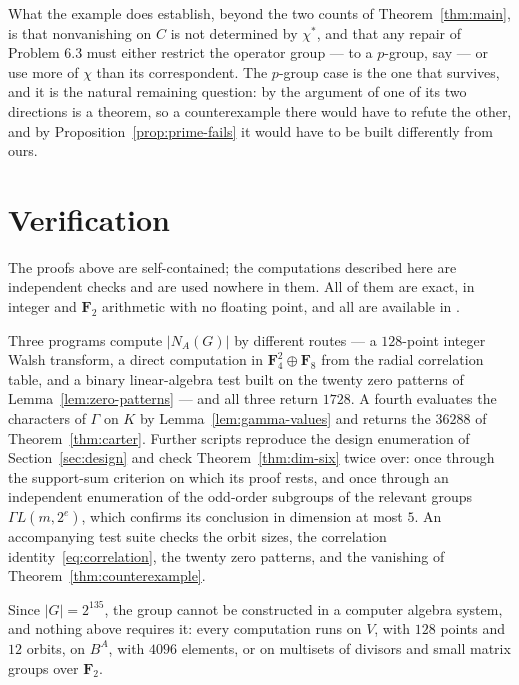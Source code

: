 \documentclass[11pt]{article}
\theoremstyle{definition}
\theoremstyle{remark}
\newcommand{\F}{\mathbf F}
\begin{document}
What the example does establish, beyond the two counts of
Theorem~\ref{thm:main}, is that nonvanishing on $C$ is not determined by
$\chi^*$, and that any repair of Problem 6.3 must either restrict the
operator group --- to a $p$-group, say --- or use more of $\chi$ than
its correspondent.  The $p$-group case is the one that survives, and it
is the natural remaining question: by the argument of
\cite[\S7]{isaacs-carter} one of its two directions is a theorem, so a
counterexample there would have to refute the other, and by
Proposition~\ref{prop:prime-fails} it would have to be built
differently from ours.

\section{Verification}\label{sec:verification}

The proofs above are self-contained; the computations described here are
independent checks and are used nowhere in them.  All of them are exact,
in integer and $\F_2$ arithmetic with no floating point, and all are
available in \cite{code}.

Three programs compute $|N_A(G)|$ by different routes --- a $128$-point
integer Walsh transform, a direct computation in $\F_4^2\oplus\F_8$ from
the radial correlation table, and a binary linear-algebra test built on
the twenty zero patterns of Lemma~\ref{lem:zero-patterns} --- and all
three return $1728$.  A fourth evaluates the characters of $\Gamma$ on
$K$ by Lemma~\ref{lem:gamma-values} and returns the $36288$ of
Theorem~\ref{thm:carter}.  Further scripts reproduce the design
enumeration of Section~\ref{sec:design} and check
Theorem~\ref{thm:dim-six} twice over: once through the support-sum
criterion on which its proof rests, and once through an independent
enumeration of the odd-order subgroups of the relevant groups
$\Gamma L(m,2^e)$, which confirms its conclusion in dimension at most
$5$.  An accompanying test suite checks the orbit sizes, the correlation
identity~\eqref{eq:correlation}, the twenty zero patterns, and the
vanishing of Theorem~\ref{thm:counterexample}.

Since $|G|=2^{135}$, the group cannot be constructed in a computer
algebra system, and nothing above requires it: every computation runs on
$V$, with $128$ points and $12$ orbits, on $B^A$, with $4096$ elements,
or on multisets of divisors and small matrix groups over $\F_2$.
\end{document}
